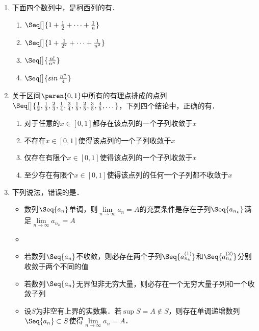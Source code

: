 \begin{enumerate}
\item 下面四个数列中，是柯西列的有\uline{}．
  \begin{enumerate}
    \renewcommand{\labelenumii}{\enumparen{\arabic{enumii}}}
  \item \(\Seq[\big]{1 + \frac12 + \dots + \frac1n}\)
  \item \(\Seq[\big]{1 + \frac1{2^2} + \dots + \frac1{n^2}}\)
  \item \(\Seq[\big]{\frac{n!}{n^n}}\)
  \item \(\Seq[\big]{\sin\frac{n^n}{4}}\) %
  \end{enumerate}

\item 关于区间\(\paren{0,1}\)中所有的有理点排成的点列\(\Seq[\big]{\frac12, \frac13, \frac23, \frac14, \frac34, \frac15, \frac25, \frac35, \frac45, \dots}\)，下列四个结论中，正确的有\uline{}．
  \begin{enumerate}
    \renewcommand{\labelenumii}{\enumparen{\arabic{enumii}}}
  \item 对于任意的\(x \in [0,1]\)都存在该点列的一个子列收敛于\(x\)
  \item 不存在\(x \in [0,1]\)使得该点列的一个子列收敛于\(x\)
  \item 仅存在有限个\(x \in [0,1]\)使得该点列的一个子列收敛于\(x\)
  \item 至少存在有限个\(x \in [0,1]\)使得该点列的任何一个子列都不收敛于\(x\)
  \end{enumerate}

\item 下列说法，错误的是\uline{\makebox[6em]{}}．
  \begin{itemize}
    \renewcommand{\labelitemi}{\faCircleThin}
  \item 数列\(\Seq{a_n}\)单调，则\(\lim\limits_{n\to\infty} a_n = A\)的充要条件是存在子列\(\Seq{a_{n_k}}\)满足\(\lim\limits_{n\to\infty} a_{n_k} = A\)
    \ifshowsol
    \item[\faCircle]
    \else
    \item
    \fi
    若数列\(\Seq{a_n}\)不收敛，则必存在两个子列\(\Seq{a_{n_k}^{(1)}}\)和\(\Seq{a_{n_k}^{(2)}}\)分别收敛于两个不同的值
  \item 若数列\(\Seq{a_n}\)无界但非无穷大量，则必存在一个无穷大量子列和一个收敛子列
  \item 设\(S\)为非空有上界的实数集．若\(\sup S = A \notin S\)，则存在单调递增数列\(\Seq{a_n} \subset S\)使得\(\lim\limits_{n\to\infty} a_n = A\)．
  \end{itemize}
\end{enumerate}
\fi

